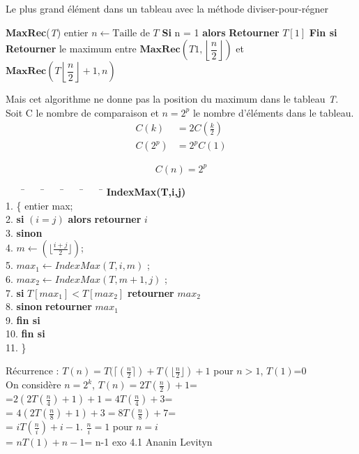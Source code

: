 \documentclass{article}[12pt]
\newcommand*{\Si}{\textbf{Si }}
\newcommand*{\finsi}{\textbf{Fin si }}
\newcommand*{\alors}{\textbf{alors }}
\newcommand*{\res}{\textbf{Retourner }}
\begin{document}
\begin{algorithm}
\caption{Le plus grand élément dans un tableau avec la méthode diviser-pour-régner}
\begin{algorithmic}[1]
\State\textbf{MaxRec}(\textit{T})
\State \qquad entier $n \gets \text{Taille de } \textit{T}$
\State \qquad \Si n = 1 \alors
\State \qquad \qquad \res$\textit{T}[1]$
\State \qquad \finsi
\State \qquad \res le maximum entre $\textbf{MaxRec}\left(\textit{T}1,\left\lfloor\dfrac{n}{2}\right\rfloor\right)$ et $\textbf{MaxRec}\left(\textit{T}\left\lfloor\dfrac{n}{2}\right\rfloor + 1, n\right)$
\end{algorithmic}
\end{algorithm}
Mais cet algorithme ne donne pas la position du maximum dans le tableau \textit{T}. Soit C le nombre de comparaison et $n = 2^p$ le nombre d'éléments dans le tableau.
\begin{align*}
    C(k) &= 2C\left(\frac{k}{2}\right)\\
    C(2^p) &= 2^p C(1)
\end{align*}
\begin{center}
    \begin{tcolorbox}[text width = 3.5cm]
        \[C(n) = 2^p\]
    \end{tcolorbox}
\end{center}


\begin{tabbing}
~~~~\=~~~~\=~~~~\=~~~~\=~~~~\=\kill
\> \textbf{IndexMax(T,i,j)}\\
1.\> \{ entier max;\\
2.\> \textbf{si} $(i=j)$ \textbf{alors} \textbf{retourner} $i$\\
3.\> \textbf{sinon} \\
4.\> \> $m \leftarrow ( \lfloor \frac{i+j}{2}\rfloor)$;\\
5. \> \> $max_1 \leftarrow IndexMax(T,i,m)$ ;\\
6. \> \> $max_2 \leftarrow IndexMax(T,m+1,j)$ ;\\
7. \> \> \textbf{si} $T[max_1]<T[max_2]$ \textbf{retourner} $max_2$\\
8. \> \> \textbf{sinon} \textbf{retourner} $max_1$\\
9. \> \> \textbf{fin si}\\
10. \> \textbf{fin si}\\
11.\> \}
\end{tabbing}

Récurrence : $T(n)= T(\lceil (\frac{n}{2}\rceil)+T(\lfloor\frac{n}{2}\rfloor)+1$ pour $n>1$, $T(1)$=0\\
On considère $n=2^k$, $T(n)=2T(\frac{n}{2})+1$=\\
=$2(2T(\frac{n}{4})+1)+1=4T(\frac{n}{4})+3$=\\
= $4 (2 T(\frac{n}{8})+1)+3=8 T(\frac{n}{8})+7$=\\
= $i T(\frac{n}{i})+i-1$. $\frac{n}{i}=1$ pour $n=i$\\
= $ n T(1)+n-1$= n-1
exo 4.1 Ananin Levityn 
\end{document}
